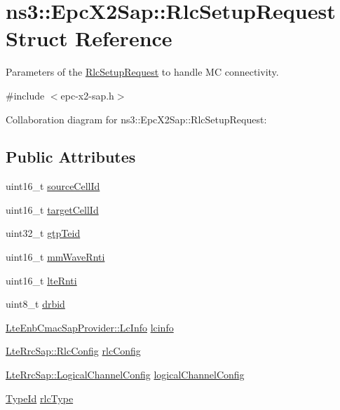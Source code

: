 \hypertarget{structns3_1_1EpcX2Sap_1_1RlcSetupRequest}{}\section{ns3\+:\+:Epc\+X2\+Sap\+:\+:Rlc\+Setup\+Request Struct Reference}
\label{structns3_1_1EpcX2Sap_1_1RlcSetupRequest}


Parameters of the \hyperlink{structns3_1_1EpcX2Sap_1_1RlcSetupRequest}{Rlc\+Setup\+Request} to handle MC connectivity.  




{\ttfamily \#include $<$epc-\/x2-\/sap.\+h$>$}



Collaboration diagram for ns3\+:\+:Epc\+X2\+Sap\+:\+:Rlc\+Setup\+Request\+:
\subsection*{Public Attributes}
\begin{DoxyCompactItemize}
\item 
uint16\+\_\+t \hyperlink{structns3_1_1EpcX2Sap_1_1RlcSetupRequest_afce35d71ef2c18fc97fa489967dbf610}{source\+Cell\+Id}
\item 
uint16\+\_\+t \hyperlink{structns3_1_1EpcX2Sap_1_1RlcSetupRequest_acf02682651bbf7a82e792e489e58f5b4}{target\+Cell\+Id}
\item 
uint32\+\_\+t \hyperlink{structns3_1_1EpcX2Sap_1_1RlcSetupRequest_a056cd975c44c994dd1ce6fc9bcf24d2c}{gtp\+Teid}
\item 
uint16\+\_\+t \hyperlink{structns3_1_1EpcX2Sap_1_1RlcSetupRequest_ad07a8d47863e7aaaecbf845718c1bce0}{mm\+Wave\+Rnti}
\item 
uint16\+\_\+t \hyperlink{structns3_1_1EpcX2Sap_1_1RlcSetupRequest_ab6df0a4f1369b82c18901b5e228853be}{lte\+Rnti}
\item 
uint8\+\_\+t \hyperlink{structns3_1_1EpcX2Sap_1_1RlcSetupRequest_a20d363419524ebcd6c86c2533bc6f283}{drbid}
\item 
\hyperlink{structns3_1_1LteEnbCmacSapProvider_1_1LcInfo}{Lte\+Enb\+Cmac\+Sap\+Provider\+::\+Lc\+Info} \hyperlink{structns3_1_1EpcX2Sap_1_1RlcSetupRequest_a845bbf31d60943a6a9553353bceb0a24}{lcinfo}
\item 
\hyperlink{structns3_1_1LteRrcSap_1_1RlcConfig}{Lte\+Rrc\+Sap\+::\+Rlc\+Config} \hyperlink{structns3_1_1EpcX2Sap_1_1RlcSetupRequest_aeb77129e409eeb05ec893b1adb26b72b}{rlc\+Config}
\item 
\hyperlink{structns3_1_1LteRrcSap_1_1LogicalChannelConfig}{Lte\+Rrc\+Sap\+::\+Logical\+Channel\+Config} \hyperlink{structns3_1_1EpcX2Sap_1_1RlcSetupRequest_a34059fb10b184d264a2517cfa07fb7de}{logical\+Channel\+Config}
\item 
\hyperlink{classns3_1_1TypeId}{Type\+Id} \hyperlink{structns3_1_1EpcX2Sap_1_1RlcSetupRequest_a5fbe483f8f9a06b437b0747e04f12978}{rlc\+Type}
\end{DoxyCompactItemize}


